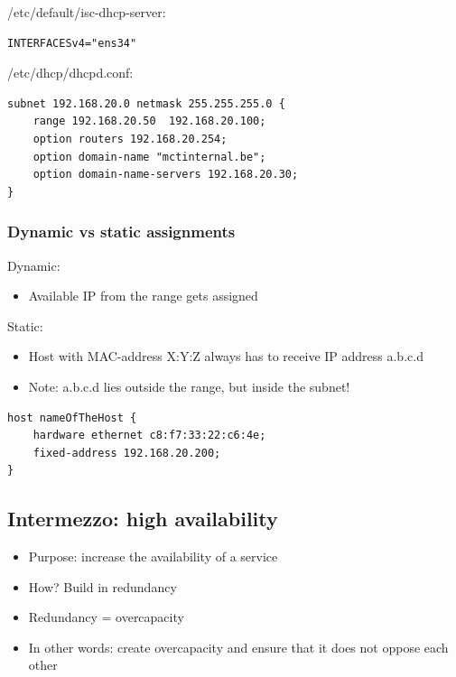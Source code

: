 \documentclass{article}
\begin{document}
/etc/default/isc-dhcp-server:

\begin{verbatim}
INTERFACESv4="ens34"
\end{verbatim}

/etc/dhcp/dhcpd.conf:

\begin{verbatim}
subnet 192.168.20.0 netmask 255.255.255.0 {
    range 192.168.20.50  192.168.20.100;
    option routers 192.168.20.254;
    option domain-name "mctinternal.be";
    option domain-name-servers 192.168.20.30;
}
\end{verbatim}

\subsubsection{Dynamic vs static assignments}

Dynamic:

\begin{itemize}
    \item Available IP from the range gets assigned
\end{itemize}

Static:

\begin{itemize}
    \item Host with MAC-address X:Y:Z always has to receive IP address a.b.c.d
    \item Note: a.b.c.d lies outside the range, but inside the subnet!
\end{itemize}

\begin{verbatim}
host nameOfTheHost {
    hardware ethernet c8:f7:33:22:c6:4e;
    fixed-address 192.168.20.200;
}
\end{verbatim}

\subsection{Intermezzo: high availability}

\begin{itemize}
    \item Purpose: increase the availability of a service
    \item How? Build in redundancy
    \item Redundancy = overcapacity
    \item In other words: create overcapacity and ensure that it does not oppose each other
\end{itemize}
\end{document}
